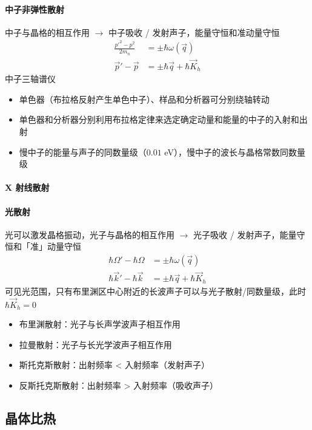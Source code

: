 \paragraph{中子非弹性散射}

中子与晶格的相互作用 $\rightarrow$ 中子吸收 / 发射声子，能量守恒和准动量守恒
\begin{align*}
    \frac{p'^2 - p^2}{2 m_n} & = \pm \hbar \omega(\vec{q})           \\
    \vec{p}' - \vec{p}       & = \pm \hbar \vec{q} + \hbar \vec{K}_h
\end{align*}
中子三轴谱仪
\begin{itemize}
    \item 单色器（布拉格反射产生单色中子）、样品和分析器可分别绕轴转动
    \item 单色器和分析器分别利用布拉格定律来选定确定动量和能量的中子的入射和出射
    \item 慢中子的能量与声子的同数量级（$0.01$ eV），慢中子的波长与晶格常数同数量级
\end{itemize}

\paragraph{X 射线散射}

\paragraph{光散射}

光可以激发晶格振动，光子与晶格的相互作用 $\rightarrow$ 光子吸收 / 发射声子，能量守恒和「准」动量守恒
\begin{align*}
    \hbar \Omega' - \hbar \Omega   & = \pm \hbar \omega(\vec{q})           \\
    \hbar \vec{k}' - \hbar \vec{k} & = \pm \hbar \vec{q} + \hbar \vec{K}_h
\end{align*}
可见光范围，只有布里渊区中心附近的长波声子可以与光子散射/同数量级，此时 $\hbar \vec{K}_h = 0$
\begin{itemize}
    \item 布里渊散射：光子与长声学波声子相互作用
    \item 拉曼散射：光子与长光学波声子相互作用
    \item 斯托克斯散射：出射频率 < 入射频率（发射声子）
    \item 反斯托克斯散射：出射频率 > 入射频率（吸收声子）
\end{itemize}

\subsection{晶体比热}

